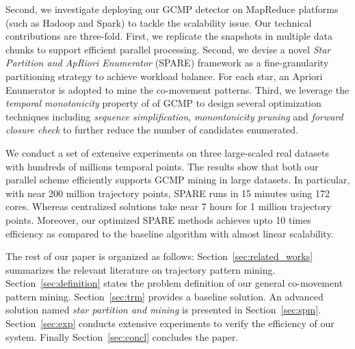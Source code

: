 


%

Second, we investigate deploying our GCMP detector on MapReduce platforms (such as Hadoop and Spark) to tackle the scalability issue. Our technical contributions are three-fold. First, we replicate the snapshots in multiple data chunks to support efficient parallel processing. Second, we devise a novel \emph{Star Partition and ApRiori Enumerator} (SPARE) framework as a fine-granularity partitioning strategy to achieve workload balance. For each star, an Apriori Enumerator is adopted to mine the co-movement patterns. Third, we leverage the \emph{temporal monotonicity} property of of GCMP 
to design several optimization techniques including \emph{sequence simplification}, \emph{monontonicity pruning} and \emph{forward closure check} to further reduce the number of candidates enumerated.
%


We conduct a set of extensive experiments on three large-scaled real datasets with hundreds of millions 
temporal points. 
The results show that both our parallel scheme efficiently supports GCMP mining in large datasets.
In particular, with near 200 million trajectory points, 
SPARE runs in 15 minutes using 172 cores. Whereas
centralized solutions take near 7 hours 
for 1 million trajectory points.
Moreover, our optimized SPARE methods achieves upto 10 times efficiency
as compared to the baseline algorithm with almost linear scalability.

The rest of our paper is organized as follows: Section~\ref{sec:related_works} summarizes the relevant literature on 
trajectory pattern mining. Section~\ref{sec:definition} states the problem definition of our general co-movement pattern mining. Section~\ref{sec:trm} provides a baseline solution. An advanced solution named
\emph{star partition and mining} is presented in Section~\ref{sec:spm}. Section~\ref{sec:exp} conducts extensive experiments to verify the efficiency of our system. Finally Section~\ref{sec:concl} concludes the paper.
